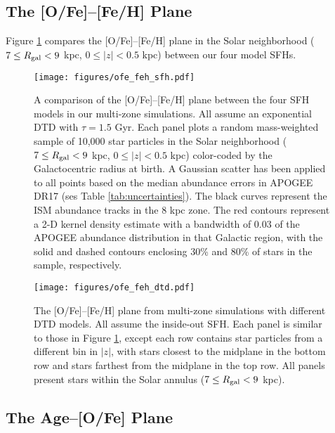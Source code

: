 \documentclass[modern,linenumbers]{aastex631}
\begin{document}
\subsection{The [O/Fe]--[Fe/H] Plane}
\label{sec:ofe-feh}

Figure \ref{fig:ofe-feh-sfh} compares the [O/Fe]--[Fe/H] plane in the Solar neighborhood ($7\leq R_{\rm gal}<9$ kpc, $0\leq|z|<0.5$ kpc) between our four model SFHs. 

\begin{figure}
    \centering
    \texttt{[image: figures/ofe\_feh\_sfh.pdf]}
    \caption{A comparison of the [O/Fe]--[Fe/H] plane between the four SFH models in our multi-zone simulations. All assume an exponential DTD with $\tau=1.5$ Gyr. Each panel plots a random mass-weighted sample of 10,000 star particles in the Solar neighborhood ($7\leq R_{\rm gal}<9$ kpc, $0\leq|z|<0.5$ kpc) color-coded by the Galactocentric radius at birth. A Gaussian scatter has been applied to all points based on the median abundance errors in APOGEE DR17 (ses Table \ref{tab:uncertainties}). The black curves represent the ISM abundance tracks in the 8 kpc zone. The red contours represent a 2-D kernel density estimate with a bandwidth of 0.03 of the APOGEE abundance distribution in that Galactic region, with the solid and dashed contours enclosing 30\% and 80\% of stars in the sample, respectively.}
    \label{fig:ofe-feh-sfh}
\end{figure}

\begin{figure*}
    \centering
    \texttt{[image: figures/ofe\_feh\_dtd.pdf]}
    \caption{The [O/Fe]--[Fe/H] plane from multi-zone simulations with different DTD models. All assume the inside-out SFH. Each panel is similar to those in Figure \ref{fig:ofe-feh-sfh}, except each row contains star particles from a different bin in $|z|$, with stars closest to the midplane in the bottom row and stars farthest from the midplane in the top row. All panels present stars within the Solar annulus ($7\leq R_{\rm gal}<9$ kpc).}
    \label{fig:ofe-feh-dtd}
\end{figure*}

\subsection{The Age--[O/Fe] Plane}
\label{sec:age-ofe}
\end{document}
